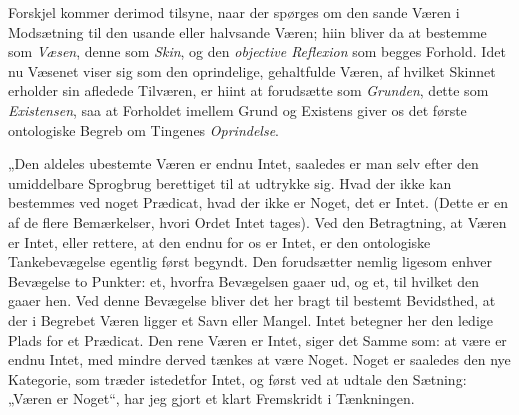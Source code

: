\documentclass[12pt]{book}
\begin{document}
Forskjel kommer derimod tilsyne, naar der spørges om den sande Væren i Modsætning til
den usande eller halvsande Væren; hiin bliver da at bestemme som \emph{Væsen}, denne
som \emph{Skin}, og den \emph{objective Reflexion} som begges Forhold. Idet nu
Væsenet viser sig som den oprindelige, gehaltfulde Væren, af hvilket Skinnet erholder
sin afledede Tilværen, er hiint at forudsætte som \emph{Grunden}, dette som
\emph{Existensen}, saa at Forholdet imellem Grund og Existens giver os det første
ontologiske Begreb om Tingenes \emph{Oprindelse}.

„Den aldeles ubestemte Væren er endnu Intet, saaledes er man selv efter den
umiddelbare Sprogbrug berettiget til at udtrykke sig. Hvad der ikke kan bestemmes ved
noget Prædicat, hvad der ikke er Noget, det er Intet. (Dette er en af de flere
Bemærkelser, hvori Ordet Intet tages). Ved den Betragtning, at Væren er Intet, eller
rettere, at den endnu for os er Intet, er den ontologiske Tankebevægelse egentlig
først begyndt. Den forudsætter nemlig ligesom enhver Bevægelse to Punkter: et, hvorfra
Bevægelsen gaaer ud, og et, til hvilket den gaaer hen. Ved denne Bevægelse bliver det
her bragt til bestemt Bevidsthed, at der i Begrebet Væren ligger et Savn eller Mangel.
Intet betegner her den ledige Plads for et Prædicat. Den rene Væren er Intet, siger
det Samme som: at være er endnu Intet, med mindre derved tænkes at være Noget. Noget
er saaledes den nye Kategorie, som træder istedetfor Intet, og først ved at udtale den
Sætning: „Væren er Noget“, har jeg gjort et klart Fremskridt i Tænkningen.
\end{document}
